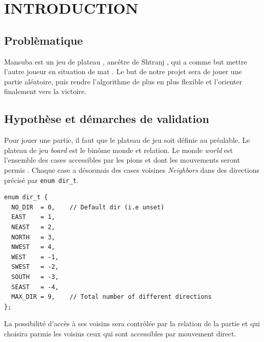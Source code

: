 \documentclass[a4paper]{article}
\begin{document}
\author{Réalisé par:\\MOHAMMED BOUHAJA ET AMIRA ELOUAZZANI \\\textbf{Encadré par: Julien Allali}}
\date{}
\maketitle





\newpage

\tableofcontents

\newpage




  


\section{INTRODUCTION}
\subsection{Problèmatique}
Mansuba est un jeu de plateau , ancêtre de Shtranj , qui a comme but mettre l’autre joueur en situation de mat . 
Le but de notre projet sera de jouer une partie aléatoire, puis rendre l'algorithme de plus en plus flexible
et l'orienter finalement vers la victoire. 
\subsection{Hypothèse et démarches de validation}
Pour jouer une partie, il faut que le plateau de jeu soit définie au préalable. Le plateau de jeu \textit{board}  est 
le binôme monde et relation. 
Le monde \textit{world} est l’ensemble des cases accessibles par les pions et dont les mouvements seront permis . Chaque case a 
désormais des cases voisines \textit{Neighbors} dans des directions précisé par \lstinline|enum dir_t|.
\begin{lstlisting}
enum dir_t {
  NO_DIR  = 0,    // Default dir (i.e unset)
  EAST    = 1,
  NEAST   = 2,
  NORTH   = 3,
  NWEST   = 4,
  WEST    = -1,
  SWEST   = -2,
  SOUTH   = -3,
  SEAST   = -4,
  MAX_DIR = 9,    // Total number of different directions
};
\end{lstlisting}
La possibilité d’accès à ses voisins sera contrôlée par la relation de la partie et qui choisira parmis les voisins ceux qui sont
 accessibles par mouvement direct.  
 
\end{document}
